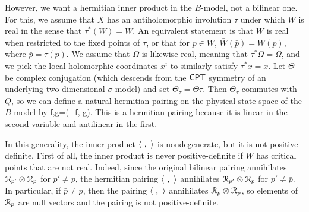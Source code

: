 \documentclass[11pt,a4paper]{article}
\begin{document}
However, we want a hermitian inner product in the $B$-model, not a bilinear one.   For this, we assume that $X$ has an antiholomorphic
involution $\tau$ under which $W$ is real in the sense that $\tau^*(W)=\bar W$.    An equivalent statement is that $W$ is real when restricted to the fixed points
of $\tau$, or that for $p\in W$, $\bar W(\bar p)=W(p)$, where  $\bar p=\tau(p)$. We assume that $\varOmega$ is likewise real, meaning that
$\tau^*\varOmega=\bar\varOmega$, and we 
 pick the local holomorphic coordinates $x^i$ to similarly satisfy $\tau^*x =\bar x$.
    Let $\Theta$ be complex conjugation (which descends from the $\sf{CPT}$ symmetry of an underlying two-dimensional $\sigma$-model)
and set $\Theta_\tau=\Theta\tau$.   Then $\Theta_\tau$ commutes with $Q$, so we can define a natural hermitian pairing on the physical
state space of the $B$-model by
\be\label{inparts}\la f,g\ra =(\Theta_\tau f, g). \ee
This is a hermitian pairing because it is linear in the second variable and antilinear in the first.

In this generality, the inner product $\langle~,~\rangle$ is nondegenerate, but it is not positive-definite.
First of all, the inner product is never positive-definite if $W$ has critical points that are not real. 
   Indeed, since the original bilinear pairing  annihilates ${\mathcal R}_{p'}\otimes {\mathcal R}_p$ for $p'\not=p$,
    the hermitian pairing $\langle~,~\rangle$ annihilates ${\mathcal R}_{p'}\otimes {\mathcal R}_p$ for $p'\not=\bar p$.   In particular, if $\bar p\not=p$, then the pairing
$\langle~,~\rangle$ annihilates ${\mathcal R}_p \otimes {\mathcal R}_p$, so elements of ${\mathcal R}_p$ are null vectors and the pairing is not positive-definite.
\end{document}
